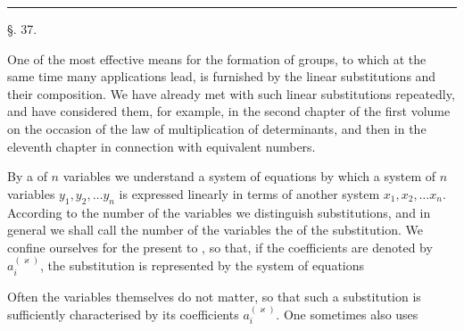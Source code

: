 
\begin{center}

\end{center}

\begin{center}
\rule{3cm}{0.4pt}
\end{center}

\begin{center}
§. 37.

\end{center}

One of the most effective means for the formation of groups, to which at the same time many applications lead, is furnished by the linear substitutions and their composition. We have already met with such linear substitutions repeatedly, and have considered them, for example, in the second chapter of the first volume on the occasion of the law of multiplication of determinants, and then in the eleventh chapter in connection with equivalent numbers.

By a  of $n$ variables we understand a system of equations by which a system of $n$ variables $y_1, y_2, \dots y_n$ is expressed linearly in terms of another system $x_1, x_2, \dots x_n$. According to the number of the variables we distinguish  substitutions, and in general we shall call the number of the variables the  of the substitution. We confine ourselves for the present to , so that, if the coefficients are denoted by $a_i^{(\varkappa)}$, the substitution is represented by the system of equations


Often the variables themselves do not matter, so that such a substitution is sufficiently characterised by its coefficients $a_i^{(\varkappa)}$. One sometimes also uses
